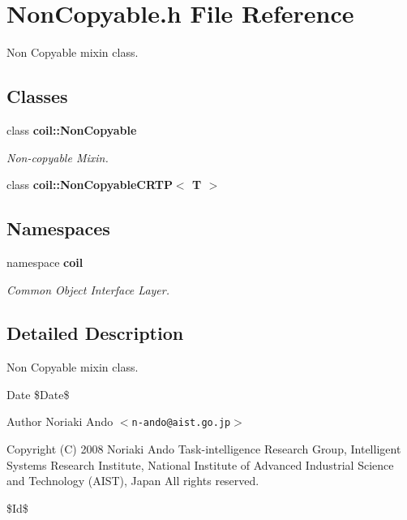\section{NonCopyable.h File Reference}
\label{NonCopyable_8h}


Non Copyable mixin class.  


\subsection*{Classes}
\begin{DoxyCompactItemize}
\item 
class {\bf coil::NonCopyable}
\begin{DoxyCompactList}\small\item\em Non-\/copyable Mixin. \item\end{DoxyCompactList}\item 
class {\bf coil::NonCopyableCRTP$<$ T $>$}
\end{DoxyCompactItemize}
\subsection*{Namespaces}
\begin{DoxyCompactItemize}
\item 
namespace {\bf coil}


\begin{DoxyCompactList}\small\item\em Common Object Interface Layer. \item\end{DoxyCompactList}

\end{DoxyCompactItemize}


\subsection{Detailed Description}
Non Copyable mixin class. \begin{DoxyDate}{Date}
\$Date\$ 
\end{DoxyDate}
\begin{DoxyAuthor}{Author}
Noriaki Ando $<${\tt n-\/ando@aist.go.jp}$>$
\end{DoxyAuthor}
Copyright (C) 2008 Noriaki Ando Task-\/intelligence Research Group, Intelligent Systems Research Institute, National Institute of Advanced Industrial Science and Technology (AIST), Japan All rights reserved.

\$Id\$ 